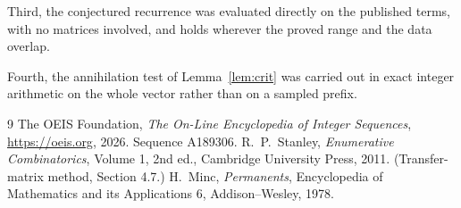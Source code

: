 \documentclass[11pt,a4paper]{article}
\theoremstyle{plain}
\theoremstyle{definition}
\begin{document}
Third, the conjectured recurrence was evaluated directly on the published terms, with no
matrices involved, and holds wherever the proved range and the data overlap.

Fourth, the annihilation test of Lemma~\ref{lem:crit} was carried out in exact integer
arithmetic on the whole vector rather than on a sampled prefix.

\begin{thebibliography}{9}
 The OEIS Foundation, \emph{The On-Line Encyclopedia of Integer
Sequences}, \url{https://oeis.org}, 2026. Sequence A189306.
 R.~P.~Stanley, \emph{Enumerative Combinatorics}, Volume 1, 2nd ed.,
Cambridge University Press, 2011. (Transfer-matrix method, Section 4.7.)
 H.~Minc, \emph{Permanents}, Encyclopedia of Mathematics and its
Applications 6, Addison--Wesley, 1978.
\end{thebibliography}
\end{document}
